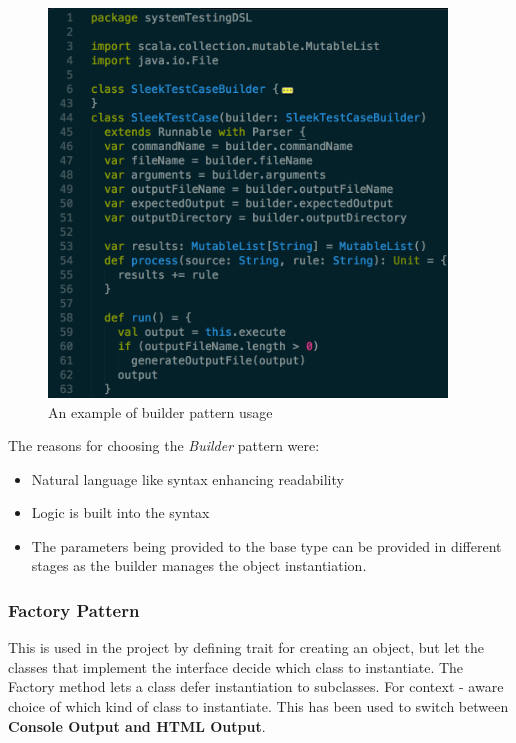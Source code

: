 \begin{figure}[H]
  \centering
    \includegraphics[width=400px]{figures/builder_pattern.png}
  \caption{An example of builder pattern usage}
\end{figure}

\noindent
The reasons for choosing the \textit{Builder} pattern were:
\begin{itemize}
\item Natural language like syntax enhancing readability
\item Logic is built into the syntax
\item The parameters being provided to the base type can be provided in different stages as the builder manages the object instantiation.
\end{itemize}

\subsubsection{Factory Pattern}
This is used in the project by defining trait for creating an object, but let the classes that implement the interface decide which class to instantiate. The Factory method lets a class defer instantiation to subclasses. For context - aware choice of which kind of class to instantiate. This has been used to switch between \textbf{Console Output and HTML Output}.

